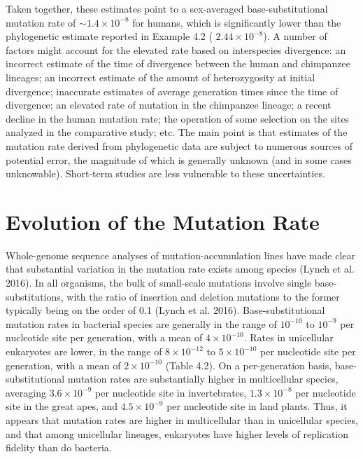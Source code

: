 \documentclass{article}
\begin{document}
Taken together, these estimates point to a sex-averaged base-substitutional mutation rate of  $ \sim1.4 \times 10^{-8} $ for humans, which is significantly lower than the phylogenetic estimate reported in Example 4.2 ( $ 2.44 \times 10^{-8} $). A number of factors might account for the elevated rate based on interspecies divergence: an incorrect estimate of the time of divergence between the human and chimpanzee lineages; an incorrect estimate of the amount of heterozygosity at initial divergence; inaccurate estimates of average generation times since the time of divergence; an elevated rate of mutation in the chimpanzee lineage; a recent decline in the human mutation rate; the operation of some selection on the sites analyzed in the comparative study; etc. The main point is that estimates of the mutation rate derived from phylogenetic data are subject to numerous sources of potential error, the magnitude of which is generally unknown (and in some cases unknowable). Short-term studies are less vulnerable to these uncertainties.

\section{Evolution of the Mutation Rate}
Whole-genome sequence analyses of mutation-accumulation lines have made clear that substantial variation in the mutation rate exists among species (Lynch et al. 2016). In all organisms, the bulk of small-scale mutations involve single base-substitutions, with the ratio of insertion and deletion mutations to the former typically being on the order of 0.1 (Lynch et al. 2016). Base-substitutional mutation rates in bacterial species are generally in the range of  $ 10^{-10} $ to  $ 10^{-9} $ per nucleotide site per generation, with a mean of  $ 4 \times 10^{-10} $. Rates in unicellular eukaryotes are lower, in the range of  $ 8 \times 10^{-12} $ to  $ 5 \times 10^{-10} $ per nucleotide site per generation, with a mean of  $ 2 \times 10^{-10} $ (Table 4.2). On a per-generation basis, base-substitutional mutation rates are substantially higher in multicellular species, averaging  $ 3.6 \times 10^{-9} $ per nucleotide site in invertebrates,  $ 1.3 \times 10^{-8} $ per nucleotide site in the great apes, and  $ 4.5 \times 10^{-9} $ per nucleotide site in land plants. Thus, it appears that mutation rates are higher in multicellular than in unicellular species, and that among unicellular lineages, eukaryotes have higher levels of replication fidelity than do bacteria.
\end{document}
